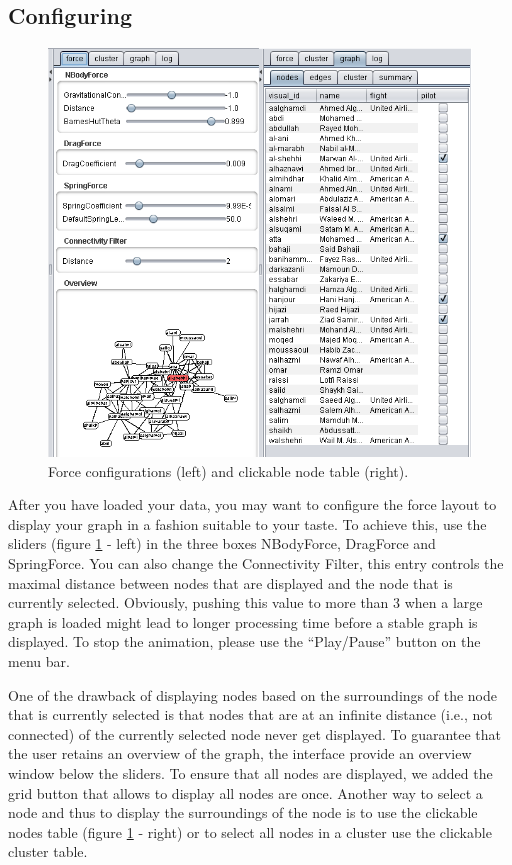 \documentclass[a4paper, 11pt]{article}
\begin{document}
	\subsection{Configuring}
		\begin{figure}[h!]
			\centering \includegraphics[width = 1\textwidth]{img/settings.png}
			\caption{Force configurations (left) and clickable node table (right).} \label{fig:force}
		\end{figure}
		
		After you have loaded your data, you may want to configure the force layout to display your graph in a 
		fashion suitable to your taste. To achieve this, use the sliders (figure \ref{fig:force} - left) in the 
		three boxes NBodyForce, DragForce and SpringForce. You can also change the Connectivity Filter, this 
		entry controls the maximal distance between nodes that are displayed and the node that is currently selected. 
		Obviously, pushing this value to more than 3 when a large graph is loaded might lead to longer processing 
		time before a stable graph is displayed. To stop the animation, please use the ``Play/Pause'' button on the menu bar.

		One of the drawback of displaying nodes based on the surroundings of the node that is currently selected 
		is that nodes that are at an infinite distance (i.e., not connected) of the currently selected node never 
		get displayed. To guarantee that the user retains an overview of the graph, the interface provide an overview window below the sliders.
		To ensure that all nodes are displayed, we added the grid button that allows to display all nodes are once. 
		Another way to select a node and thus to display the surroundings of the node is to use the clickable nodes table (figure \ref{fig:force} - right)
		or to select all nodes in a cluster use the clickable cluster table.		
	
\end{document}
